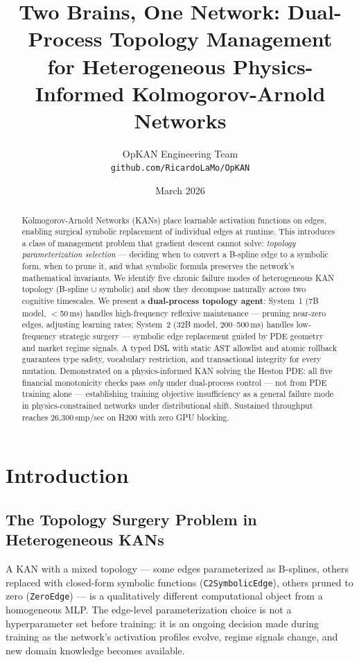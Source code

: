\documentclass[11pt,a4paper]{article}
\title{\textbf{Two Brains, One Network: Dual-Process Topology Management\\for Heterogeneous Physics-Informed Kolmogorov-Arnold Networks}}
\author{OpKAN Engineering Team \\ \texttt{github.com/RicardoLaMo/OpKAN}}
\date{March 2026}
\begin{document}
\maketitle

\begin{abstract}
Kolmogorov-Arnold Networks (KANs) place learnable activation functions on edges,
enabling surgical symbolic replacement of individual edges at runtime. This
introduces a class of management problem that gradient descent cannot solve:
\emph{topology parameterization selection} --- deciding when to convert a B-spline
edge to a symbolic form, when to prune it, and what symbolic formula preserves the
network's mathematical invariants. We identify five chronic failure modes of
heterogeneous KAN topology (B-spline $\cup$ symbolic) and show they decompose
naturally across two cognitive timescales. We present a \textbf{dual-process topology
agent}: System~1 (7B model, $<$50\,ms) handles high-frequency reflexive maintenance
--- pruning near-zero edges, adjusting learning rates; System~2 (32B model, 200--500\,ms)
handles low-frequency strategic surgery --- symbolic edge replacement guided by PDE
geometry and market regime signals. A typed DSL with static AST allowlist and atomic
rollback guarantees type safety, vocabulary restriction, and transactional integrity
for every mutation. Demonstrated on a physics-informed KAN solving the Heston PDE:
all five financial monotonicity checks pass \emph{only} under dual-process control ---
not from PDE training alone --- establishing training objective insufficiency as a
general failure mode in physics-constrained networks under distributional shift.
Sustained throughput reaches 26,300\,smp/sec on H200 with zero GPU blocking.
\end{abstract}

\section{Introduction}
\label{sec:intro}

\subsection{The Topology Surgery Problem in Heterogeneous KANs}
\label{sec:intro:surgery}

A KAN with a mixed topology --- some edges parameterized as B-splines, others replaced
with closed-form symbolic functions (\texttt{C2SymbolicEdge}), others pruned to zero
(\texttt{ZeroEdge}) --- is a qualitatively different computational object from a
homogeneous MLP. The edge-level parameterization choice is not a hyperparameter set
before training: it is an ongoing decision made during training as the network's
activation profiles evolve, regime signals change, and new domain knowledge becomes
available.
\end{document}

